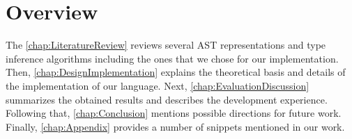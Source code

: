 \newpage

\section{Overview}

The \cref{chap:LiteratureReview} reviews several AST representations and type inference algorithms including the ones that we chose for our implementation.
Then, \cref{chap:DesignImplementation} explains the theoretical basis and details of the implementation of our language.
Next, \cref{chap:EvaluationDiscussion} summarizes the obtained results and describes the development experience.
Following that, \cref{chap:Conclusion} mentions possible directions for future work.
Finally, \cref{chap:Appendix} provides a number of snippets mentioned in our work.
